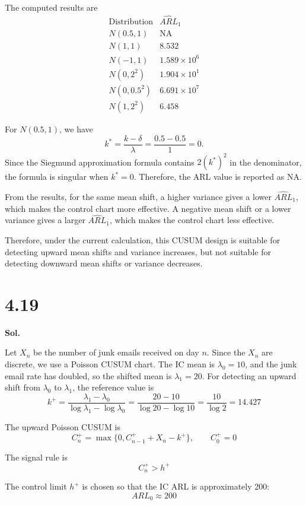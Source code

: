 \documentclass[a4paper, 12pt]{article}  %
\begin{document}
The computed results are
\[
\begin{array}{c|c}
\text{Distribution} & \widehat{ARL}_1 \\ \hline
N(0.5,1) & \text{NA} \\
N(1,1) & 8.532 \\
N(-1,1) & 1.589\times 10^6 \\
N(0,2^2) & 1.904\times 10^1 \\
N(0,0.5^2) & 6.691\times 10^7 \\
N(1,2^2) & 6.458
\end{array}
\]

For \(N(0.5,1)\), we have
\[
k^*=\frac{k-\delta}{\lambda}=\frac{0.5-0.5}{1}=0.
\]
Since the Siegmund approximation formula contains \(2(k^*)^2\) in the
denominator, the formula is singular when \(k^*=0\). Therefore, the ARL
value is reported as NA.

From the results, for the same mean shift, a higher variance gives a
lower \(\widehat{ARL}_1\), which makes the control chart more effective.
A negative mean shift or a lower variance gives a larger
\(\widehat{ARL}_1\), which makes the control chart less effective.

Therefore, under the current calculation, this CUSUM design is suitable
for detecting upward mean shifts and variance increases, but not suitable
for detecting downward mean shifts or variance decreases.

\section*{4.19}
\textbf{Sol.}

Let \(X_n\) be the number of junk emails received on day \(n\). Since the $X_n$ are discrete, we use a Poisson CUSUM chart.
The IC mean is $\lambda_0=10$, and the junk email rate has doubled, so the shifted mean is $\lambda_1=20$.
For detecting an upward shift from \(\lambda_0\) to \(\lambda_1\), the reference value is
\[
k^+
=
\frac{\lambda_1-\lambda_0}{\log\lambda_1-\log\lambda_0}
=
\frac{20-10}{\log 20-\log 10}
=
\frac{10}{\log 2}
=
14.427
\]

The upward Poisson CUSUM is
\[
C_n^+=\max\{0,C_{n-1}^+ + X_n-k^+\},
\qquad C_0^+=0
\]

The signal rule is
\[
C_n^+>h^+
\]

The control limit \(h^+\) is chosen so that the IC ARL is approximately 200:
\[
ARL_0\approx 200
\]
\end{document}
